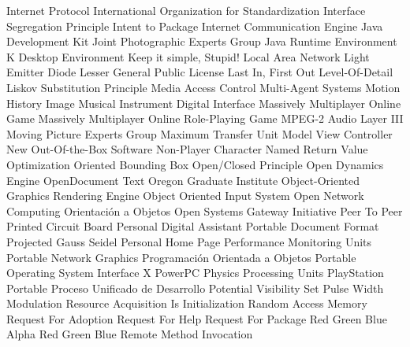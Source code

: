{\begin{acronym}[XXXXXXXX]
     {Internet Protocol}
    {International Organization for Standardization}
    {Interface Segregation Principle}
    {Intent to Package}
    {Internet Communication Engine}
    {Java Development Kit}
    {Joint Photographic Experts Group}
    {Java Runtime Environment}
    {K Desktop Environment}
   {Keep it simple, Stupid!}
    {Local Area Network}
    {Light Emitter Diode}
   {Lesser General Public License}
   {Last In, First Out}
    {Level-Of-Detail}
    {Liskov Substitution Principle}
    {Media Access Control}
    {Multi-Agent Systems}
    {Motion History Image}
   {Musical Instrument Digital Interface}
   {Massively Multiplayer Online Game}
 {Massively Multiplayer Online Role-Playing Game}
    {\acs{MPEG}-2 Audio Layer III}
   {Moving Picture Experts Group}
    {Maximum Transfer Unit}
    {Model View Controller}
  {New Out-Of-the-Box Software}
    {Non-Player Character}
   {Named Return Value Optimization}
    {Oriented Bounding Box}
    {Open/Closed Principle}
    {Open Dynamics Engine}
    {OpenDocument Text}
    {Oregon Graduate Institute}
   {Object-Oriented Graphics Rendering Engine}
    {Object Oriented Input System}
    {Open Network Computing}
     {Orientación a Objetos}
   {Open Systems Gateway Initiative}
    {Peer To Peer}
    {Printed Circuit Board}
    {Personal Digital Assistant}
    {Portable Document Format}
    {Projected Gauss Seidel}
    {Personal Home Page}
    {Performance Monitoring Units}
    {Portable Network Graphics}
    {Programación Orientada a Objetos}
  {Portable Operating System Interface X}
    {PowerPC}
    {Physics Processing Units}
    {PlayStation Portable}
    {Proceso Unificado de Desarrollo}
    {Potential Visibility Set}
    {Pulse Width Modulation}
   {Resource Acquisition Is Initialization}
    {Random Access Memory}
    {Request For Adoption}
    {Request For Help}
    {Request For Package}
   {Red Green Blue Alpha}
    {Red Green Blue}
    {Remote Method Invocation}

\end{acronym}}
